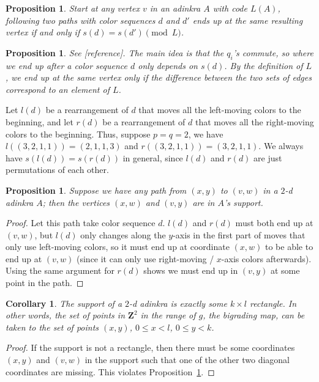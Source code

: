 \documentclass[12pt,twoside,singlespace]{article}
\numberwithin{equation}{section}
\newtheorem{cor}[equation]{Corollary}
\newtheorem{prop}[equation]{Proposition}
\theoremstyle{definition}
\newcommand{\ZZ}{\mathbf{Z}}
\begin{document}
\begin{prop}
\label{prop:paths}
Start at any vertex $v$ in an adinkra $A$ with code $L(A)$, following two paths with color sequences $d$ and $d'$ ends up at the same resulting vertex if and only if $s(d) = s(d') \pmod{L}$.
\end{prop}
\begin{prop}
See [reference]. The main idea is that the $q_i$'s commute, so where we end up after a color sequence $d$ only depends on $s(d)$. By the definition of $L$, we end up at the same vertex only if the difference between the two sets of edges correspond to an element of $L$.
\end{prop}

Let $l(d)$ be a rearrangement of $d$ that moves all the left-moving colors to the beginning, and let $r(d)$ be a rearrangement of $d$ that moves all the right-moving colors to the beginning. Thus, suppose $p = q = 2$, we have $l((3,2,1,1)) = (2,1,1,3)$ and $r((3,2,1,1)) = (3,2,1,1)$. We always have $s(l(d)) = s(r(d))$ in general, since $l(d)$ and $r(d)$ are just permutations of each other.

\begin{prop}
\label{prop:rectangle-completion}
Suppose we have any path from $(x,y)$ to $(v,w)$ in a $2$-d adinkra $A$; then the vertices $(x,w)$ and $(v,y)$ are in $A$'s support.
\end{prop}
\begin{proof}
Let this path take color sequence $d$. $l(d)$ and $r(d)$ must both end up at $(v,w)$, but $l(d)$ only changes along the $y$-axis in the first part of moves that only use left-moving colors, so it must end up at coordinate $(x,w)$ to be able to end up at $(v,w)$ (since it can only use right-moving / $x$-axis colors afterwards). Using the same argument for $r(d)$ shows we must end up in $(v,y)$ at some point in the path.
\end{proof}

\begin{cor}
\label{cor:rectangle}
The support of a $2$-d adinkra is exactly some $k \times l$ rectangle. In other words, the set of points in $\ZZ^2$ in the range of $g$, the bigrading map, can be taken to the set of points $(x,y)$, $0 \leq x < l$, $0 \leq y < k$.
\end{cor}
\begin{proof}
If the support is not a rectangle, then there must be some coordinates $(x,y)$ and $(v,w)$ in the support such that one of the other two diagonal coordinates are missing. This violates Proposition~\ref{prop:rectangle-completion}.
\end{proof}
\end{document}
